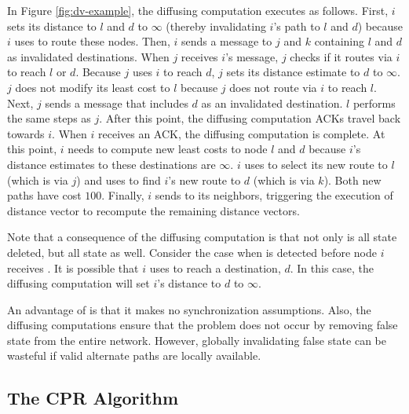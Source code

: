 
In Figure \ref{fig:dv-example}, the diffusing computation executes as follows. First, $i$ sets its distance to $l$ and $d$ to $\infty$ (thereby invalidating $i$'s path to $l$ and $d$)
because $i$ uses \bad to route these nodes. Then, $i$ sends a message to $j$ and $k$ containing $l$ and $d$ as invalidated destinations.
When $j$ receives $i$'s message, $j$ checks if it routes via $i$ to reach $l$ or $d$. Because $j$ uses $i$ to reach $d$, $j$ sets its distance estimate to $d$ to $\infty$. 
$j$ does not modify its least cost to $l$ because $j$ does not route via $i$ to reach $l$. Next, $j$ sends a message that includes $d$ as an invalidated destination.
$l$ performs the same steps as $j$. After this point, the diffusing computation ACKs travel back towards $i$. When $i$ receives an ACK, the diffusing computation is complete. At this
point, $i$ needs to compute new least costs to node $l$ and $d$ because $i$'s distance estimates to these destinations are $\infty$. 
$i$ uses \dmatrixi to select its new route to $l$ (which is via $j$) and uses \dmatrixi to find $i$'s new route to $d$ (which is via $k$). Both new paths have cost $100$. Finally,
$i$ sends \minvi to its neighbors, triggering the execution of distance vector to recompute the remaining distance vectors.

Note that a consequence of the diffusing computation is that not only is all \badvector state deleted, but all \oldvector state as well.  
Consider the case when \bad is detected before node $i$ receives \badvectors.
It is possible that $i$ uses \oldvector to reach a destination, $d$. In this case, the diffusing computation will set $i$'s distance to $d$ to $\infty$.

An advantage of \purge is that it makes no synchronization assumptions. Also, the diffusing computations ensure that the \infinity problem does not occur by removing
false state from the entire network. However, globally invalidating false state can be wasteful if valid alternate paths are locally available. 


\subsection{The CPR Algorithm}
\label{subsec:cpr}



